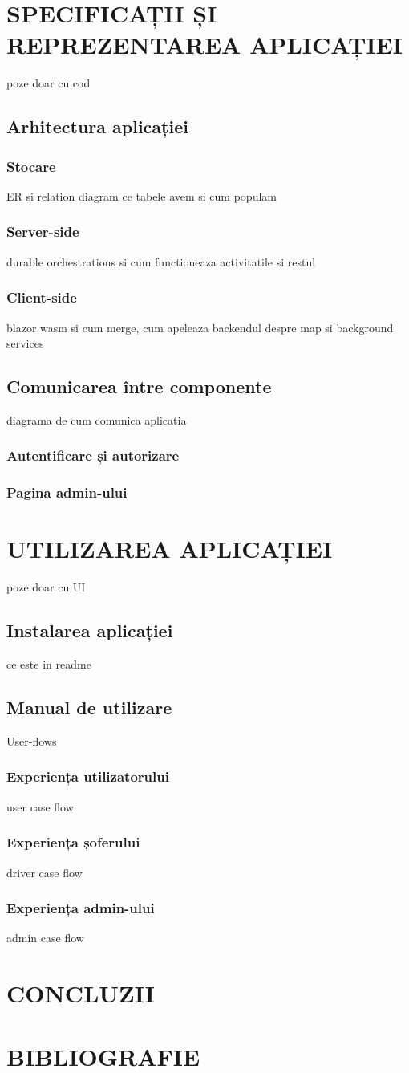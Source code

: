 \documentclass[a4paper,12pt]{report}
\begin{document}
\chapter{SPECIFICAȚII ȘI REPREZENTAREA APLICAȚIEI}
poze doar cu cod
\section{Arhitectura aplicației}
\subsection{Stocare}
ER si relation diagram
ce tabele avem si cum populam
\subsection{Server-side}
durable orchestrations si cum functioneaza activitatile si restul
\subsection{Client-side}
blazor wasm si cum merge, cum apeleaza backendul
despre map si background services
\section{Comunicarea între componente}
diagrama de cum comunica aplicatia
\subsection{Autentificare și autorizare}
\subsection{Pagina admin-ului}
\chapter{UTILIZAREA APLICAȚIEI}
poze doar cu UI
\section{Instalarea aplicației}
ce este in readme
\section{Manual de utilizare}
User-flows
\subsection{Experiența utilizatorului}
user case flow
\subsection{Experiența șoferului}
driver case flow
\subsection{Experiența admin-ului}
admin case flow
\newpage
\chapter{CONCLUZII}
\newpage
\chapter{BIBLIOGRAFIE}
\end{document}
